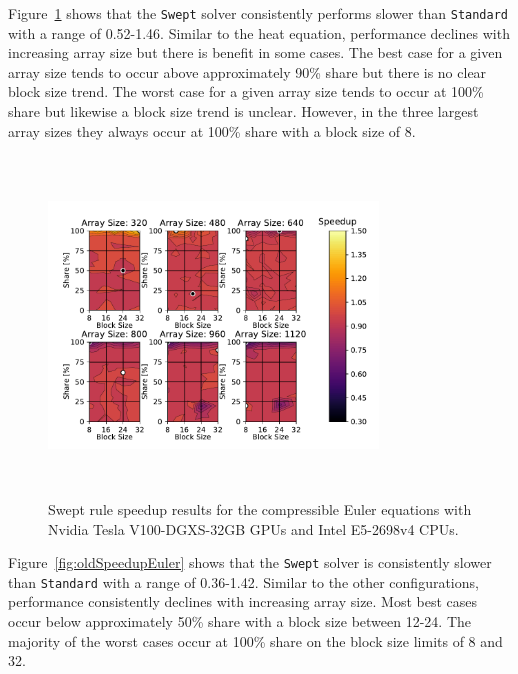 \documentclass[preprints,article,accept,moreauthors,pdftex]{Definitions/mdpi}
\def\Swept{\texttt{Swept}}
\def\Standard{\texttt{Standard}}
\def\newCPU{Intel E5-2698v4} %
\def\newGPU{Nvidia Tesla V100-DGXS-32GB}
\begin{document}
Figure~\ref{fig:newSpeedupEuler} shows that the \Swept{} solver consistently performs slower than \Standard{} with a range of 0.52-1.46. Similar to the heat equation, performance declines with increasing array size but there is benefit in some cases. The best case for a given array size tends to occur above approximately 90\% share but there is no clear block size trend. The worst case for a given array size tends to occur at 100\% share but likewise a block size trend is unclear. However, in the three largest array sizes they always occur at 100\% share with a block size of 8.


\begin{figure}[htbp]
    \centering
    \includegraphics[height=9cm,width=0.78\textwidth, trim={0.75cm 0.4cm 0.8cm 0.7cm},clip]{figs/speedUpeulerNew.pdf}
    \caption{Swept rule speedup results  for the compressible Euler equations with \newGPU{} GPUs and \newCPU{} CPUs.}
    \label{fig:newSpeedupEuler}
\end{figure}

Figure~\ref{fig:oldSpeedupEuler} shows that the \Swept{} solver is consistently slower than \Standard{} with a range of 0.36-1.42. Similar to the other configurations, performance consistently declines with increasing array size. Most best cases occur below approximately 50\% share with a block size between 12-24. The majority of the worst cases occur at 100\% share on the block size limits of 8 and 32.
\end{document}
